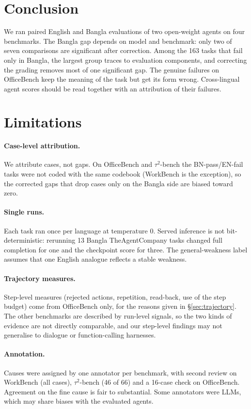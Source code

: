 \documentclass[11pt]{article}
\newcommand{\OB}{OfficeBench}
\newcommand{\WB}{WorkBench}
\newcommand{\TAU}{$\tau^2$-bench}
\newcommand{\TAC}{TheAgentCompany}
\begin{document}
\section{Conclusion}
We ran paired English and Bangla evaluations of two open-weight agents on four benchmarks. The
Bangla gap depends on model and benchmark: only two of seven comparisons are significant after
correction. Among the 163 tasks that fail only in Bangla, the largest group traces to evaluation
components, and correcting the grading removes most of one significant gap. The genuine failures
on \OB{} keep the meaning of the task but get its form wrong. Cross-lingual agent scores should be
read together with an attribution of their failures.

\section*{Limitations}

\paragraph{Case-level attribution.} We attribute cases, not gaps. On \OB{} and \TAU{} the
BN-pass/EN-fail tasks were not coded with the same codebook (\WB{} is the exception), so the
corrected gaps that drop cases only on the Bangla side are biased toward zero.

\paragraph{Single runs.} Each task ran once per language at temperature 0. Served inference is
not bit-deterministic: rerunning 13 Bangla \TAC{} tasks changed full completion for one and the
checkpoint score for three. The
general-weakness label assumes that one English analogue reflects a stable weakness.

\paragraph{Trajectory measures.} Step-level measures (rejected actions, repetition, read-back,
use of the step budget) come from \OB{} only, for the reasons given in \S\ref{sec:trajectory}. The
other benchmarks are described by run-level signals, so the two kinds of evidence are not directly
comparable, and our step-level findings may not generalise to dialogue or function-calling
harnesses.

\paragraph{Annotation.} Causes were assigned by one annotator per benchmark, with second review on
\WB{} (all cases), \TAU{} (46 of 66) and a 16-case check on \OB{}. Agreement on the fine cause is
fair to substantial. Some annotators were LLMs, which may share biases with the evaluated agents.
\end{document}
